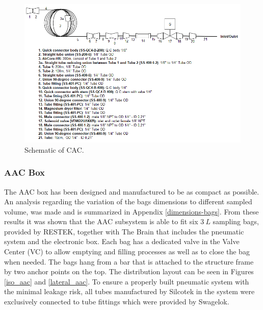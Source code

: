 \begin{landscape}
\begin{figure}[H]
    \centering
    \includegraphics[width=1.3\textwidth]{4-experiment-design/img/Mechanical/CAC-schematic.PNG}
    \caption{Schematic of CAC.}
    \label{fig:CAC-schematic}
\end{figure}
\end{landscape}
\smallskip

\pagebreak
\subsubsection{AAC Box}\label{sec:aac-analysis}
The AAC box has been designed and manufactured to be as compact as possible. An analysis regarding the variation of the bags dimensions to different sampled volume, was made and is summarized in Appendix \ref{dimensions-bags}. From these results it was shown that the AAC subsystem is able to fit six $3\ L$ sampling bags, provided by RESTEK, together with The Brain that includes the pneumatic system and the electronic box. Each bag has a dedicated valve in the Valve Center (VC) to allow emptying and filling processes as well as to close the bag when needed. The bags hang from a bar that is attached to the structure frame by two anchor points on the top. The distribution layout can be seen in Figures \ref{iso_aac} and \ref{lateral_aac}. To ensure a properly built pneumatic system with the minimal leakage risk, all tubes manufactured by Silcotek in the system were exclusively connected to tube fittings which were provided by Swagelok. 
 


